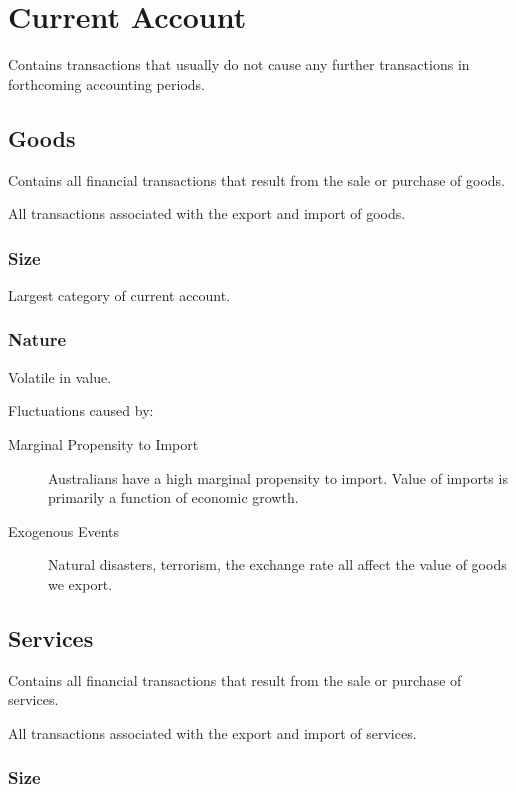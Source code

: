 \documentclass[a4paper,11pt]{article}
\begin{document}
\section{Current Account}

Contains transactions that usually do not cause any further transactions in
forthcoming accounting periods.


\subsection{Goods}

Contains all financial transactions that result from the sale or purchase of
goods.

All transactions associated with the export and import of goods.


\subsubsection{Size}

Largest category of current account.


\subsubsection{Nature}

Volatile in value.

Fluctuations caused by:

\begin{description}
\item [Marginal Propensity to Import] Australians have a high marginal
	propensity to import. Value of imports is primarily a function of economic
	growth.
\item [Exogenous Events] Natural disasters, terrorism, the exchange rate all
	affect the value of goods we export.
\end{description}


\subsection{Services}

Contains all financial transactions that result from the sale or purchase of
services.

All transactions associated with the export and import of services.


\subsubsection{Size}
\end{document}
